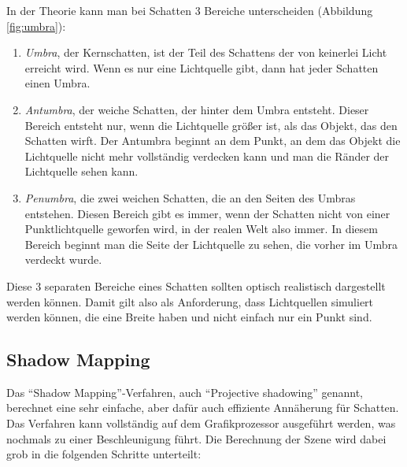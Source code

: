 In der Theorie kann man bei Schatten 3 Bereiche unterscheiden (Abbildung \ref{fig:umbra}):
\begin{enumerate}
 \item \emph{Umbra}, der Kernschatten, ist der Teil des Schattens der von keinerlei Licht erreicht wird.
       Wenn es nur eine Lichtquelle gibt, dann hat jeder Schatten einen Umbra.
 \item \emph{Antumbra}, der weiche Schatten, der hinter dem Umbra entsteht. Dieser Bereich entsteht nur,
       wenn die Lichtquelle größer ist, als das Objekt, das den Schatten wirft. Der Antumbra beginnt an
       dem Punkt, an dem das Objekt die Lichtquelle nicht mehr vollständig verdecken kann und man die
       Ränder der Lichtquelle sehen kann.
 \item \emph{Penumbra}, die zwei weichen Schatten, die an den Seiten des Umbras entstehen. Diesen Bereich
       gibt es immer, wenn der Schatten nicht von einer Punktlichtquelle geworfen wird, in der realen
       Welt also immer. In diesem Bereich beginnt man die Seite der Lichtquelle zu sehen, die vorher im
       Umbra verdeckt wurde.
\end{enumerate}
Diese 3 separaten Bereiche eines Schatten sollten optisch realistisch dargestellt werden können.
Damit gilt also als Anforderung, dass Lichtquellen simuliert werden können, die eine Breite haben
und nicht einfach nur ein Punkt sind.


\subsection{Shadow Mapping}

Das "`Shadow Mapping"'-Verfahren, auch "`Projective shadowing"' genannt, berechnet eine sehr einfache,
aber dafür auch effiziente Annäherung für Schatten. Das Verfahren kann vollständig auf dem
Grafikprozessor ausgeführt werden, was nochmals zu einer Beschleunigung führt. Die Berechnung der
Szene wird dabei grob in die folgenden Schritte unterteilt:

